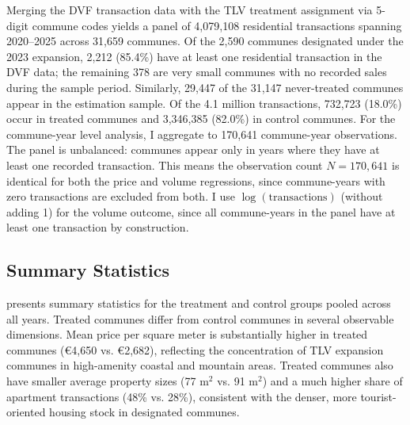 \documentclass[12pt]{article}
\begin{document}
Merging the DVF transaction data with the TLV treatment assignment via 5-digit commune codes yields a panel of 4,079,108 residential transactions spanning 2020--2025 across 31,659 communes. Of the 2,590 communes designated under the 2023 expansion, 2,212 (85.4\%) have at least one residential transaction in the DVF data; the remaining 378 are very small communes with no recorded sales during the sample period. Similarly, 29,447 of the 31,147 never-treated communes appear in the estimation sample. Of the 4.1 million transactions, 732,723 (18.0\%) occur in treated communes and 3,346,385 (82.0\%) in control communes. For the commune-year level analysis, I aggregate to 170,641 commune-year observations. The panel is unbalanced: communes appear only in years where they have at least one recorded transaction. This means the observation count $N = 170,641$ is identical for both the price and volume regressions, since commune-years with zero transactions are excluded from both. I use $\log(\text{transactions})$ (without adding 1) for the volume outcome, since all commune-years in the panel have at least one transaction by construction.

\subsection{Summary Statistics}

 presents summary statistics for the treatment and control groups pooled across all years. Treated communes differ from control communes in several observable dimensions. Mean price per square meter is substantially higher in treated communes (\euro{4,650} vs. \euro{2,682}), reflecting the concentration of TLV expansion communes in high-amenity coastal and mountain areas. Treated communes also have smaller average property sizes (77 m$^2$ vs. 91 m$^2$) and a much higher share of apartment transactions (48\% vs. 28\%), consistent with the denser, more tourist-oriented housing stock in designated communes.
\end{document}
